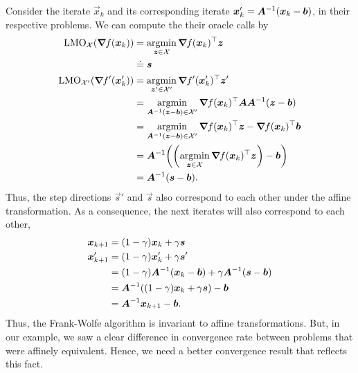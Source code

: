 Consider the iterate $\vec{x}_k$ and its corresponding iterate $\bm{x}'_k = \bm{A}^{-1}
    (\bm{x}_k - \bm{b})$, in their respective problems. We can compute the their oracle calls by
\begin{align*}
    \mathrm{LMO}_{\mathcal{X}}(\grad{f(\vec{x}_k)}{})    & = \argmin_{\vec{z} \in \mathcal{X}} \transpose{\grad{f(\vec{x}_k)}{}} \vec{z}                                                                        \\
                                                         & \doteq \vec{s}                                                                                                                                       \\
    \mathrm{LMO}_{\mathcal{X}'}(\grad{f'(\vec{x}'_k)}{}) & = \argmin_{\vec{z}' \in \mathcal{X}'} \transpose{\grad{f'(\vec{x}'_k)}{}} \vec{z}'                                                                   \\
                                                         & = \argmin_{\inv{\mat{A}} (\vec{z} - \vec{b}) \in \mathcal{X}'} \transpose{\grad{f(\vec{x}_k)}{}} \mat{A} \inv{\mat{A}} (\vec{z} - \vec{b})           \\
                                                         & = \argmin_{\inv{\mat{A}} (\vec{z} - \vec{b}) \in \mathcal{X}'} \transpose{\grad{f(\vec{x}_k)}{}} \vec{z} - \transpose{\grad{f(\vec{x}_k)}{}} \vec{b} \\
                                                         & = \inv{\mat{A}} \lft( \lft(\argmin_{\vec{z} \in \mathcal{X}} \transpose{\grad{f(\vec{x}_k)}{}} \vec{z}\rgt) - \vec{b} \rgt)                          \\
                                                         & = \inv{\mat{A}} (\vec{s} - \vec{b}).
\end{align*}
Thus, the step directions $\vec{s}'$ and $\vec{s}$ also correspond to each other under the affine
transformation. As a consequence, the next iterates will also correspond to each other,
\begin{align*}
    \bm{x}_{k+1}  & = (1- \gamma) \bm{x}_k + \gamma \bm{s}                                                     \\
    \bm{x}'_{k+1} & = (1- \gamma) \bm{x}'_k + \gamma \bm{s}'                                                   \\
                   & = (1- \gamma) \bm{A}^{-1} (\bm{x}_k - \bm{b}) + \gamma \bm{A}^{-1} (\bm{s} - \bm{b}) \\
                   & = \bm{A}^{-1} ((1-\gamma)\bm{x}_k + \gamma \bm{s}) - \bm{b}                             \\
                   & = \bm{A}^{-1} \bm{x}_{k+1} - \bm{b}.
\end{align*}
Thus, the Frank-Wolfe algorithm is invariant to affine transformations. But, in our example, we saw a
clear difference in convergence rate between problems that were affinely equivalent. Hence, we need a
better convergence result that reflects this fact.

